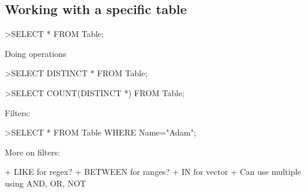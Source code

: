 
\subsection{Working with a specific table}

>SELECT * FROM Table;



Doing operations

>SELECT DISTINCT * FROM Table;

>SELECT COUNT(DISTINCT *) FROM Table;


Filters:


>SELECT * FROM Table WHERE Name="Adam";

More on filters:

+ LIKE for regex?
+ BETWEEN for ranges?
+ IN for vector
+ Can use multiple using AND, OR, NOT

